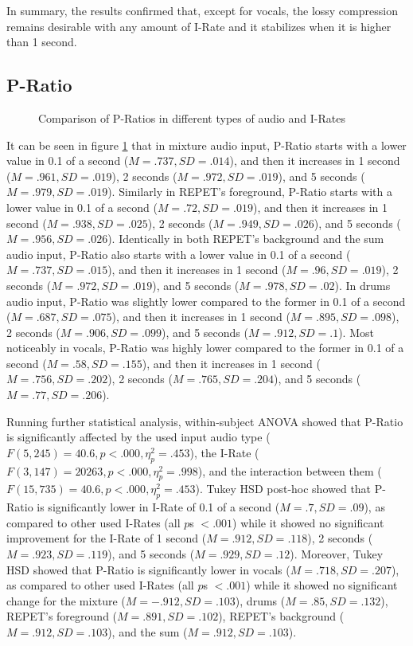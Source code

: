 In summary, the results confirmed that, except for vocals, the lossy compression remains desirable with any amount of I-Rate and it stabilizes when it is higher than 1 second.

\subsection{P-Ratio}

\begin{figure}[ht]
  
  \caption{Comparison of P-Ratios in different types of audio and I-Rates}
  \label{fig:irate-pratio}
\end{figure}

It can be seen in figure \ref{fig:irate-pratio} that in mixture audio input, P-Ratio starts with a lower value in 0.1 of a second ($M=.737, SD=.014$), and then it increases in 1 second ($M=.961, SD=.019$), 2 seconds ($M=.972, SD=.019$), and 5 seconds ($M=.979, SD=.019$).
Similarly in REPET's foreground, P-Ratio starts with a lower value in 0.1 of a second ($M=.72, SD=.019$), and then it increases in 1 second ($M=.938, SD=.025$), 2 seconds ($M=.949, SD=.026$), and 5 seconds ($M=.956, SD=.026$).
Identically in both REPET's background and the sum audio input, P-Ratio also starts with a lower value in 0.1 of a second ($M=.737, SD=.015$), and then it increases in 1 second ($M=.96, SD=.019$), 2 seconds ($M=.972, SD=.019$), and 5 seconds ($M=.978, SD=.02$).
In drums audio input, P-Ratio was slightly lower compared to the former in 0.1 of a second ($M=.687, SD=.075$), and then it increases in 1 second ($M=.895, SD=.098$), 2 seconds ($M=.906, SD=.099$), and 5 seconds ($M=.912, SD=.1$).
Most noticeably in vocals, P-Ratio was highly lower compared to the former in 0.1 of a second ($M=.58, SD=.155$), and then it increases in 1 second ($M=.756, SD=.202$), 2 seconds ($M=.765, SD=.204$), and 5 seconds ($M=.77, SD=.206$).

Running further statistical analysis,  within-subject ANOVA showed that P-Ratio is significantly affected by the used input audio type ($F(5,245)=40.6, p<.000, \eta_{p}^{2}=.453$), the I-Rate ($F(3,147)=20263, p<.000, \eta_{p}^{2}=.998$), and the interaction between them ($F(15,735)=40.6, p<.000, \eta_{p}^{2}=.453$).
Tukey HSD post-hoc showed that P-Ratio is significantly lower in I-Rate of 0.1 of a second ($M=.7, SD=.09$), as compared to other used I-Rates (all $p$s $<.001$) while it showed no significant improvement for the I-Rate of 1 second ($M=.912, SD=.118$), 2 seconds ($M=.923, SD=.119$), and 5 seconds ($M=.929, SD=.12$). Moreover, Tukey HSD showed that P-Ratio is significantly lower in vocals ($M=.718, SD=.207$), as compared to other used I-Rates (all $p$s $<.001$) while it showed no significant change for the mixture ($M=-.912, SD=.103$), drums ($M=.85, SD=.132$), REPET's foreground ($M=.891, SD=.102$), REPET's background ($M=.912, SD=.103$), and the sum ($M=.912, SD=.103$).

